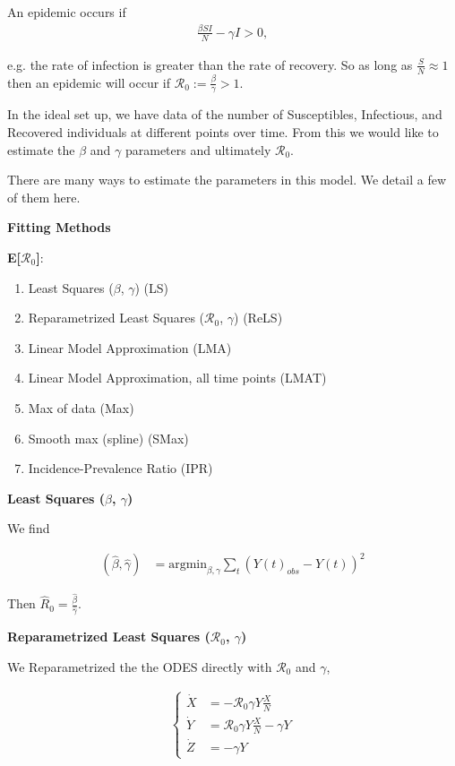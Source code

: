 \documentclass[12pt]{article}
\newcommand{\rr}{\ensuremath{\mathcal{R}_0}}
\begin{document}
An epidemic occurs if 
\begin{align*}
\frac{\beta S I}{N}  - \gamma I > 0 ,
\end{align*}

e.g. the rate of infection is greater than the rate of recovery.  So as long as $\frac{S}{N} \approx 1$ then an epidemic will occur if $\rr := \frac{\beta}{\gamma} > 1$.

In the ideal set up, we have data of the number of Susceptibles, Infectious, and Recovered individuals at different points over time.  From this we would like to estimate the $\beta$ and $\gamma$ parameters and ultimately $\rr$.

There are many ways to estimate the parameters in this model.  We detail a few of them here.


\textbf{Fitting Methods}\label{fitting-methods}

\textbf{E{[}\(\rr\){]}}:

\begin{enumerate}
\item
  Least Squares (\(\beta\), \(\gamma\)) (LS)
\item
  Reparametrized Least Squares (\(\rr\), \(\gamma\)) (ReLS)
\item
  Linear Model Approximation (LMA)
\item
  Linear Model Approximation, all time points (LMAT)
\item
  Max of data (Max)
\item
  Smooth max (spline) (SMax)
\item
  Incidence-Prevalence Ratio (IPR)
\end{enumerate}


\textbf{Least Squares ($\beta$, $\gamma$)}\label{least-squares-beta-gamma}

We find

\begin{align*}
(\hat{\beta}, \hat{\gamma} )&=\text{argmin}_{\beta, \gamma} \sum_{t} (Y(t)_{obs} - Y(t))^2 
\end{align*}

Then \(\hat{R}_0= \frac{\hat{\beta}}{\hat{\gamma}}\).

\textbf{Reparametrized Least Squares ($\rr$, $\gamma$)}\label{reparametrized-least-squares-rux5f0-gamma}

We Reparametrized the the ODES directly with \(\rr\) and \(\gamma\),

\begin{align*}
  \left \{
  \begin{array}{cl}
    \dot{X} &= - \rr \gamma Y \frac{X}{N}\\
    \dot{Y} &=  \rr \gamma Y \frac{X}{N}  - \gamma Y \\
    \dot{Z} &=  - \gamma Y 
  \end{array}
  \right .
  \end{align*}
\end{document}
